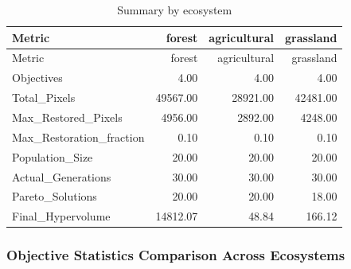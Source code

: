 \documentclass[
  letterpaper,
  DIV=11,
  numbers=noendperiod]{scrartcl}
\begin{document}
\begin{longtable}[]{@{}lrrr@{}}
\caption{Summary by ecosystem}\tabularnewline
\toprule\noalign{}
Metric & forest & agricultural & grassland \\
\midrule\noalign{}
\endfirsthead
\toprule\noalign{}
Metric & forest & agricultural & grassland \\
\midrule\noalign{}
\endhead
\bottomrule\noalign{}
\endlastfoot
Objectives & 4.00 & 4.00 & 4.00 \\
Total\_Pixels & 49567.00 & 28921.00 & 42481.00 \\
Max\_Restored\_Pixels & 4956.00 & 2892.00 & 4248.00 \\
Max\_Restoration\_fraction & 0.10 & 0.10 & 0.10 \\
Population\_Size & 20.00 & 20.00 & 20.00 \\
Actual\_Generations & 30.00 & 30.00 & 30.00 \\
Pareto\_Solutions & 20.00 & 20.00 & 18.00 \\
Final\_Hypervolume & 14812.07 & 48.84 & 166.12 \\
\end{longtable}

\subsubsection{Objective Statistics Comparison Across
Ecosystems}\label{objective-statistics-comparison-across-ecosystems}
\end{document}
